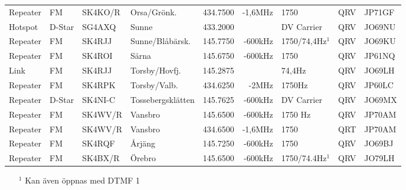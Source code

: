 \begin{landscape}
\begin{longtable}{llllrrlcl}
	Repeater                  & FM            & SK4KO/R       & Orsa/Grönk.         & 434.7500          & -1,6MHz        & 1750             & QRV             & JP71GF           \\
	Hotspot                   & D-Star        & SG4AXQ        & Sunne               & 433.2000          &                & DV Carrier       & QRV             & JO69NU           \\
	Repeater                  & FM            & SK4RJJ        & Sunne/Blåbärsk.     & 145.7750          & -600kHz        & 1750/74,4Hz$^1$  & QRV             & JO69KU           \\
	Repeater                  & FM            & SK4ROI        & Särna               & 145.6750          & -600kHz        & 1750             & QRV             & JP61NQ           \\
	Link                      & FM            & SK4RJJ        & Torsby/Hovfj.       & 145.2875          &                & 74,4Hz           & QRV             & JO69LH           \\
	Repeater                  & FM            & SK4RPK        & Torsby/Valb.        & 434.6250          & -2MHz          & 1750Hz           & QRV             & JP60LC           \\
	Repeater                  & D-Star        & SK4NI-C       & Tossebergsklätten   & 145.7625          & -600kHz        & DV Carrier       & QRV             & JO69MX           \\
	Repeater                  & FM            & SK4WV/R       & Vansbro             & 145.6500          & -600kHz        & 1750 Hz          & QRV             & JP70AM           \\
	Repeater                  & FM            & SK4WV/R       & Vansbro             & 434.6500          & -1,6MHz        & 1750             & QRT             & JP70AM           \\
	Repeater                  & FM            & SK4RQF        & Årjäng              & 145.7250          & -600kHz        & 1750             & QRV             & JO69BJ           \\
	Repeater                  & FM            & SK4BX/R       & Örebro              & 145.6500          & -600kHz        & 1750/74.4Hz$^1$  & QRV             & JO79LH
\end{longtable}
\begin{itemize}
\item[$^1$] Kan även öppnas med DTMF 1
\end{itemize}

\end{landscape}
